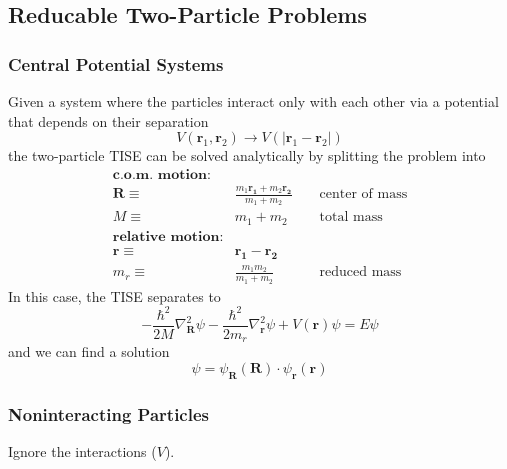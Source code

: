 \subsection{Reducable Two-Particle Problems}
\subsubsection{Central Potential Systems}

Given a system where the particles interact only with each other via a potential that depends on their separation
\begin{equation*}
    V(\mathbf{r}_1,\mathbf{r}_2)\to V(|\mathbf{r}_1-\mathbf{r}_2|)
\end{equation*}
the two-particle TISE can be solved analytically by splitting the problem into
\noindent\begin{align*}
    \textbf{c.o.m. motion:}   &                                                                              \\
    \mathbf{R}\equiv\         & \frac{m_1\mathbf{r_1}+m_2\mathbf{r_2}}{m_1+m_2} &   & \text{ center of mass} \\
    M\equiv\                  & m_1 + m_2                                       &   & \text{ total mass}     \\
    \textbf{relative motion:} &                                                                              \\
    \mathbf{r}\equiv\         & \mathbf{r_1}-\mathbf{r_2}                       &                            \\
    m_r\equiv\                & \frac{m_1 m_2}{m_1+m_2}                         &   & \text{ reduced mass}
\end{align*}
In this case, the TISE separates to
\begin{equation*}
    -\frac{\hbar^{2}}{2M}\nabla_{\mathbf{R}}^{2}\psi-\frac{\hbar^{2}}{2m_r}\nabla_{\mathbf{r}}^{2}\psi+V(\mathbf{r})\psi=E\psi
\end{equation*}
and we can find a solution
\begin{equation*}
    \psi = \psi_\mathbf{R}(\mathbf{R})\cdot\psi_\mathbf{r}(\mathbf{r})
\end{equation*}

\subsubsection{Noninteracting Particles}
Ignore the interactions ($V$).
\newpar{}

